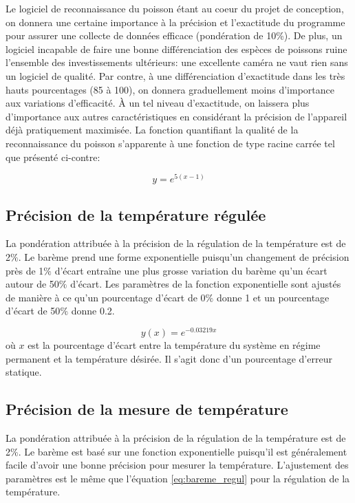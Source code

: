 Le logiciel de reconnaissance du poisson étant au coeur du projet de conception, on donnera une certaine importance à la précision et l'exactitude du programme pour assurer une collecte de données efficace (pondération de 10\%). De plus, un logiciel incapable de faire une bonne différenciation des espèces de poissons ruine l'ensemble des investissements ultérieurs: une excellente caméra ne vaut rien sans un logiciel de qualité. Par contre, à une différenciation d'exactitude dans les très hauts pourcentages (85 à 100), on donnera graduellement moins d'importance aux variations d'efficacité. À un tel niveau d'exactitude, on laissera plus d'importance aux autres caractéristiques en considérant la précision de l'appareil déjà pratiquement maximisée. La fonction quantifiant la qualité de la reconnaissance du poisson s'apparente à une fonction de type racine carrée tel que présenté ci-contre:

\begin{equation}
    y = e^{5(x-1)}
    \label{eq:bareme_precision}
\end{equation}

\subsection{Précision de la température régulée}

La pondération attribuée à la précision de la régulation de la température est de 2$\%$. Le barème prend une forme exponentielle puisqu'un changement de précision près de 1$\%$ d'écart entraîne une plus grosse variation du barème qu'un écart autour de 50$\%$ d'écart. Les paramètres de la fonction exponentielle sont ajustés de manière à ce qu'un pourcentage d'écart de 0$\%$ donne 1 et un pourcentage d'écart de 50$\%$ donne 0.2.

\begin{equation}
    y(x) = e^{-0.03219x}
    \label{eq:bareme_regul}
\end{equation}
où $x$ est la pourcentage d'écart entre la température du système en régime permanent et la température désirée. Il s'agit donc d'un pourcentage d'erreur statique.

\subsection{Précision de la mesure de température}

La pondération attribuée à la précision de la régulation de la température est de 2$\%$. Le barème est basé sur une fonction exponentielle puisqu'il est généralement facile d'avoir une bonne précision pour mesurer la température. L'ajustement des paramètres est le même que l'équation \ref{eq:bareme_regul} pour la régulation de la température.

